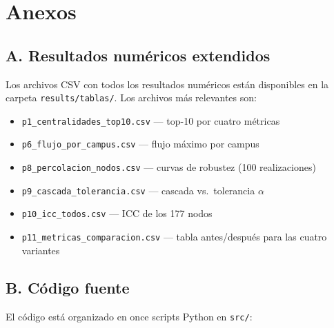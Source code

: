 \documentclass[12pt, a4paper]{article}
\newcommand{\code}[1]{\texttt{\small #1}}
\begin{document}
\section*{Anexos}

\subsection*{A. Resultados numéricos extendidos}

Los archivos CSV con todos los resultados numéricos están disponibles en la
carpeta \code{results/tablas/}. Los archivos más relevantes son:

\begin{itemize}
    \item \code{p1\_centralidades\_top10.csv} --- top-10 por cuatro métricas
    \item \code{p6\_flujo\_por\_campus.csv} --- flujo máximo por campus
    \item \code{p8\_percolacion\_nodos.csv} --- curvas de robustez (100
          realizaciones)
    \item \code{p9\_cascada\_tolerancia.csv} --- cascada vs.\ tolerancia
          $\alpha$
    \item \code{p10\_icc\_todos.csv} --- ICC de los 177 nodos
    \item \code{p11\_metricas\_comparacion.csv} --- tabla antes/después para
          las cuatro variantes
\end{itemize}

\subsection*{B. Código fuente}

El código está organizado en once scripts Python en \code{src/}:
\end{document}
